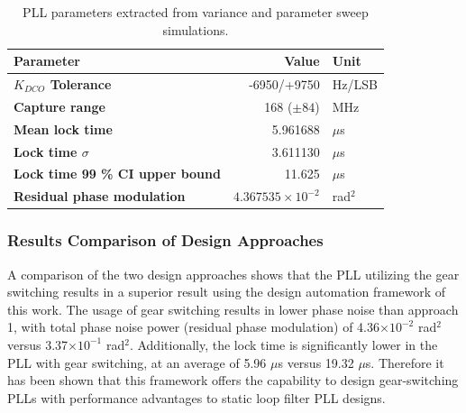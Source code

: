 \begin{table}[h!]
	\centering
	\def\arraystretch{1.5}		
	\setlength\arrayrulewidth{0.75pt}
	\setlength{\tabcolsep}{1em} %
	\begin{tabular}{|l|r|l|}
		\hline 
		\rule[-1ex]{0pt}{2.5ex} \cellcolor{gray!40}\textbf{Parameter} & \cellcolor{gray!40}\textbf{Value} & \cellcolor{gray!40}\textbf{Unit }\\ 
		\hline 
		\rule[-1ex]{0pt}{2.5ex} \textbf{$K_{DCO}$ Tolerance}  & -6950/+9750 & Hz/LSB \\
		\hline 
		\rule[-1ex]{0pt}{2.5ex} \textbf{Capture range}  & 168 ($\pm 84$)& MHz\\ 
		\hline 
		\rule[-1ex]{0pt}{2.5ex} \textbf{Mean lock time}  & 5.961688& $\mu$s \\
		\hline 
		\rule[-1ex]{0pt}{2.5ex} \textbf{Lock time $\sigma$} & 3.611130 & $\mu$s\\ 
		\hline 
		\rule[-1ex]{0pt}{2.5ex} \textbf{Lock time 99 \% CI upper bound} & 11.625  & $\mu$s\\
		\hline 
		\rule[-1ex]{0pt}{2.5ex} \textbf{Residual phase modulation} & $4.367535\times10^{-2}$ & rad$^2$\\ 
		\hline 
	\end{tabular} 

	\caption{PLL parameters extracted from variance and parameter sweep simulations.}
	\label{simulation_params_fast}
\end{table}
\pagebreak
\subsubsection{Results Comparison of Design Approaches}
A comparison of the two design approaches shows that the PLL utilizing the gear switching results in a superior result using the design automation framework of this work. The usage of gear switching results in lower phase noise than approach 1, with total phase noise power (residual phase modulation) of 4.36$\times 10^{-2}$ rad$^2$ versus 3.37$\times 10^{-1}$ rad$^2$. Additionally, the lock time is significantly lower in the PLL with gear switching, at an average of 5.96 $\mu$s versus 19.32 $\mu$s. Therefore it has been shown that this framework offers the capability to design gear-switching PLLs with performance advantages to static loop filter PLL designs.


